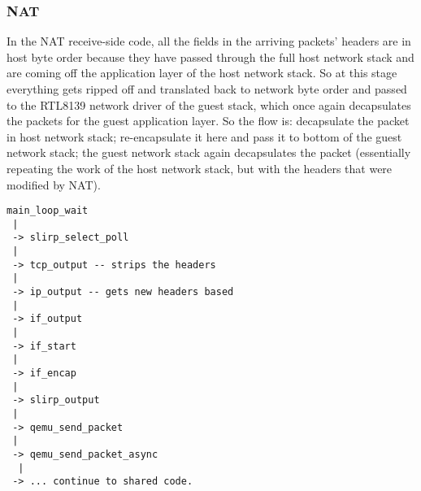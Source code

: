 \documentclass[letterpaper,twocolumn,11pt]{article}
\begin{document}
\subsubsection*{NAT}
In the NAT receive-side code, all the fields in the arriving packets' headers are in host byte order because they have passed through the full host network stack and are coming off the application layer of the host network stack. So at this stage everything gets ripped off and translated back to network byte order and passed to the RTL8139 network driver of the guest stack, which once again decapsulates the packets for the guest application layer. So the flow is: decapsulate the packet in host network stack; re-encapsulate it here and pass it to bottom of the guest network stack; the guest network stack again decapsulates the packet (essentially repeating the work of the host network stack, but with the headers that were modified by NAT). 

\begin{verbatim}
main_loop_wait
 |
 -> slirp_select_poll
 |
 -> tcp_output -- strips the headers
 |
 -> ip_output -- gets new headers based 
 |
 -> if_output
 |
 -> if_start
 |
 -> if_encap
 |
 -> slirp_output
 |
 -> qemu_send_packet
 |
 -> qemu_send_packet_async
  |
 -> ... continue to shared code.
\end{verbatim}
\end{document}
